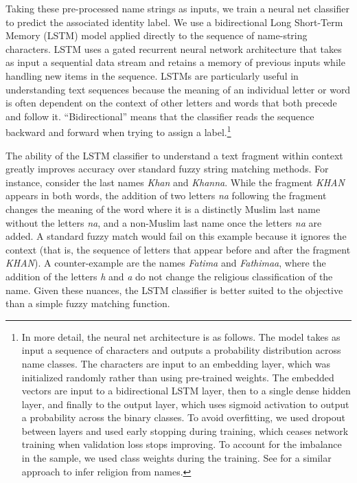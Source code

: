 \documentclass[12pt,english]{article}
\begin{document}
Taking these pre-processed name strings as inputs, we train a neural net classifier to predict the associated identity label.  We use a bidirectional Long Short-Term Memory (LSTM) model applied directly to the sequence of name-string characters. LSTM uses a gated recurrent neural network architecture that takes as input a sequential data stream and retains a memory of previous inputs while handling new items in the sequence. LSTMs are particularly useful in understanding text sequences because the meaning of an individual letter or word is often dependent on the context of other letters and words that both precede and follow it. ``Bidirectional'' means that the classifier reads the sequence backward and forward when trying to assign a label.\footnote{In more detail, the neural net architecture is as follows. The model takes as input a sequence of characters and outputs a probability distribution across name classes. The characters are input to an embedding layer, which was initialized randomly rather than using pre-trained weights. The embedded vectors are input to a bidirectional LSTM layer, then to a single dense hidden layer, and finally to the output layer, which uses sigmoid activation to output a probability across the binary classes. To avoid overfitting, we used dropout between layers and used early stopping during training, which ceases network training when validation loss stops improving.  To account for the imbalance in the sample, we used class weights during the training. See \citet{chaturvedi2020neural} for a similar approach to infer religion from names.} 

The ability of the LSTM classifier to understand a text fragment within context greatly improves accuracy over standard fuzzy string matching methods. For instance, consider the last names \textit{Khan} and \textit{Khanna}. While the fragment \textit{KHAN} appears in both words, the addition of two letters \textit{na} following the fragment changes the meaning of the word where it is a distinctly Muslim last name without the letters \textit{na}, and a non-Muslim last name once the letters \textit{na} are added. A standard fuzzy match would fail on this example because it ignores the context (that is, the sequence of letters that appear before and after the fragment \textit{KHAN}). A counter-example are the names \textit{Fatima} and \textit{Fathimaa}, where the addition of the letters \textit{h} and \textit{a} do not change the religious classification of the name. Given these nuances, the LSTM classifier is better suited to the objective than a simple fuzzy matching function.
\end{document}

